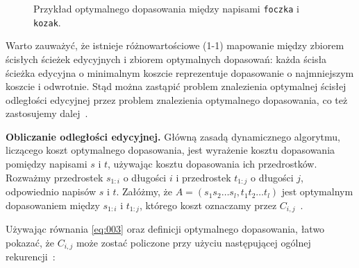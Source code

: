 \documentclass{praca1}
\begin{document}
\begin{figure}[width=80pt]
\centering
{}
\cprotect\caption{Przykład optymalnego dopasowania między napisami \verb|foczka| i \verb|kozak|.}\label{rys:001}
\end{figure}

Warto zauważyć, że istnieje różnowartościowe (1-1) mapowanie między zbiorem ścisłych ścieżek edycyjnych i zbiorem optymalnych dopasowań: każda ścisła ścieżka edycyjna o minimalnym koszcie reprezentuje dopasowanie o najmniejszym koszcie i odwrotnie. Stąd można zastąpić problem znalezienia optymalnej ścisłej odległości edycyjnej przez problem znalezienia optymalnego dopasowania, co też zastosujemy dalej~\cite{Boytsov2011:indexingmethods}.

\textbf{Obliczanie odległości edycyjnej.} Główną zasadą dynamicznego algorytmu, liczącego koszt optymalnego dopasowania, jest wyrażenie kosztu dopasowania pomiędzy napisami $s$ i $t$, używając kosztu dopasowania ich przedrostków. Rozważmy przedrostek $s_{1:i}$ o długości $i$ i przedrostek $t_{1:j}$ o długości $j$, odpowiednio napisów $s$ i $t$. Załóżmy, że $A = (s_1 s_2\ldots s_l, t_1 t_2 \ldots t_l)$ jest optymalnym dopasowaniem między $s_{1:i}$ i $t_{1:j}$, którego koszt oznaczamy przez $C_{i,j}$~\cite{Boytsov2011:indexingmethods}.

Używając równania \ref{eq:003} oraz definicji optymalnego dopasowania, łatwo pokazać, że $C_{i,j}$ może zostać policzone przy użyciu następującej ogólnej rekurencji~\cite{Ukkonen1985:algorithmsforapprox}:
\end{document}
